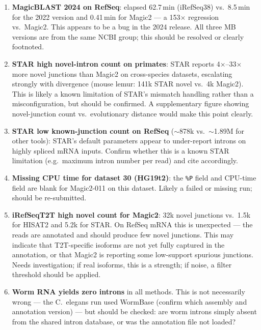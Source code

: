 \documentclass[11pt]{article}
\begin{document}
\begin{enumerate}
\item \textbf{MagicBLAST 2024 on RefSeq}: elapsed 62.7\,min
  (iRefSeq38) vs.\ 8.5\,min for the 2022 version and 0.41\,min for
  Magic2 — a 153$\times$ regression vs.\ Magic2.
  This appears to be a bug in the 2024 release.
  All three MB versions are from the same NCBI group; this should be
  resolved or clearly footnoted.

\item \textbf{STAR high novel-intron count on primates}: STAR reports
  4$\times$--33$\times$ more novel junctions than Magic2 on cross-species
  datasets, escalating strongly with divergence (mouse lemur: 141k
  STAR novel vs.\ 4k Magic2).
  This is likely a known limitation of STAR's mismatch handling rather
  than a misconfiguration, but should be confirmed.
  A supplementary figure showing novel-junction count vs.\ evolutionary
  distance would make this point clearly.

\item \textbf{STAR low known-junction count on RefSeq} ($\sim$878k vs.\
  $\sim$1.89M for other tools): STAR's default parameters appear to
  under-report introns on highly spliced mRNA inputs.
  Confirm whether this is a known STAR limitation (e.g.\ maximum intron
  number per read) and cite accordingly.

\item \textbf{Missing CPU time for dataset 30 (HG19t2)}: the
  \texttt{\%P} field and CPU-time field are blank for Magic2-011 on
  this dataset.
  Likely a failed or missing run; should be re-submitted.

\item \textbf{iRefSeqT2T high novel count for Magic2}: 32k novel
  junctions vs.\ 1.5k for HISAT2 and 5.2k for STAR.
  On RefSeq mRNA this is unexpected — the reads are annotated and
  should produce few novel junctions.
  This may indicate that T2T-specific isoforms are not yet fully
  captured in the annotation, or that Magic2 is reporting some
  low-support spurious junctions.
  Needs investigation; if real isoforms, this is a strength; if noise,
  a filter threshold should be applied.

\item \textbf{Worm RNA yields zero introns} in all methods.
  This is not necessarily wrong — the C.\ elegans run used WormBase
  (confirm which assembly and annotation version) — but should be
  checked: are worm introns simply absent from the shared intron
  database, or was the annotation file not loaded?
\end{enumerate}
\end{document}
